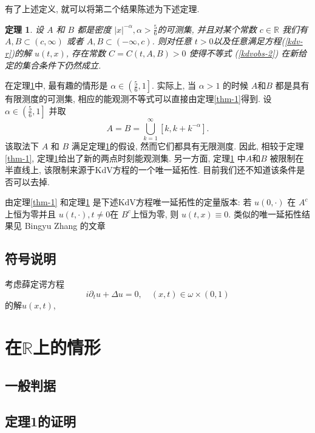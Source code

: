 \documentclass[master]{cugthesis}
\newcommand\R{\ensuremath{\mathbb{R}}}
\newcommand\Z{\ensuremath{\mathbb{Z}}}
\newcommand\T{\ensuremath{\mathbb{T}}}
\newtheorem{theorem}{定理}[chapter]
\begin{document}
    有了上述定义, 就可以将第二个结果陈述为下述定理.
    \begin{theorem}\label{thm-2}
     设 $A$ 和 $B$ 都是密度 $|x|^{-\alpha}, \alpha>\frac{5}{6}$的可测集, 并且对某个常数 $c\in\R$ 我们有 $A, B \subset (c,\infty)$ 或者 $A, B\subset (-\infty ,c)$. 则对任意 $t>0$以及任意满足方程(\ref{kdv-r})的解 $u(t,x)$, 存在常数 $C=C(t,A,B)>0$ 使得不等式 (\ref{kdvobs-2}) 在新给定的集合条件下仍然成立.
    \end{theorem}
    在定理\ref{thm-2}中, 最有趣的情形是 $\alpha\in \left(\frac{5}{6},1\right]$. 实际上, 当 $\alpha>1$ 的时候 $A$和$B$ 都是具有有限测度的可测集, 相应的能观测不等式可以直接由定理\ref{thm-1}得到. 设 $\alpha\in \left(\frac{5}{6},1\right]$ 并取
    \begin{equation*}
        A=B=\bigcup_{k=1}^\infty [k,k+k^{-\alpha}].
    \end{equation*}
    该取法下 $A$ 和 $B$ 满足定理\ref{thm-2}的假设, 然而它们都具有无限测度. 因此, 相较于定理\ref{thm-1}, 定理\ref{thm-2}给出了新的两点时刻能观测集. 另一方面, 定理\ref{thm-2} 中$A$和$B$ 被限制在半直线上, 该限制来源于KdV方程的一个唯一延拓性. 目前我们还不知道该条件是否可以去掉. 
    
    由定理\ref{thm-1} 和定理\ref{thm-2} 是下述KdV方程唯一延拓性的定量版本: 若 $u(0,\cdot)$ 在 $A^c$上恒为零并且 $u(t,\cdot),t\neq 0$在 $B^c$上恒为零, 则 $u(t,x)\equiv 0$. 类似的唯一延拓性结果见 Bingyu Zhang 的文章
    
    \iffalse 论文的第二部分考虑圆周 $\T:= \R / \Z$ 上的线性KdV方程.\cite{Ionescu2006UniquenessPO}
    \fi
    \section{符号说明}
    
    考虑薛定谔方程
    \begin{equation}
        i\partial_t u+\Delta u=0,\quad (x,t)\in \omega\times (0,1)
    \end{equation}
    的解$u(x,t)$, 
    \chapter{在$\R$上的情形}
    \section{一般判据}
    \section{定理1的证明}
\end{document}
